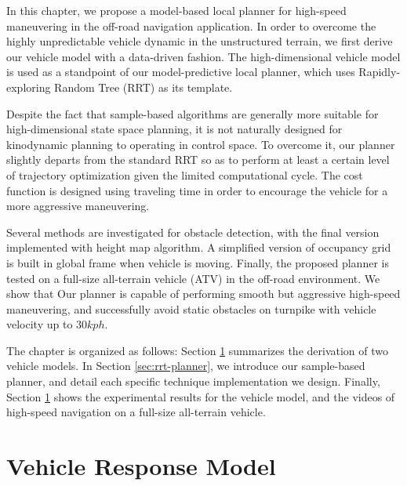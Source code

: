 \documentclass[../thesis.tex]{subfiles}
\begin{document}
In this chapter, we propose a model-based local planner for high-speed maneuvering in the off-road navigation application. In order to overcome the highly unpredictable vehicle dynamic in the unstructured terrain, we first derive our vehicle model with a data-driven fashion. The high-dimensional vehicle model is used as a standpoint of our model-predictive local planner, which uses Rapidly-exploring Random Tree (RRT) \cite{kuffner2000rrt} as its template. 

Despite the fact that sample-based algorithms are generally more suitable for high-dimensional state space planning, it is not naturally designed for kinodynamic planning to operating in control space. To overcome it, our planner slightly departs from the standard RRT so as to perform at least a certain level of trajectory optimization given the limited computational cycle. The cost function is designed using traveling time in order to encourage the vehicle for a more aggressive maneuvering. 

Several methods are investigated for obstacle detection, with the final version implemented with height map algorithm. A simplified version of occupancy grid is built in global frame when vehicle is moving. Finally, the proposed planner is tested on a full-size all-terrain vehicle (ATV) in the off-road environment. We show that 
Our planner is capable of performing smooth but aggressive high-speed maneuvering, and successfully avoid static obstacles on turnpike with vehicle velocity up to $30 kph$.

The chapter is organized as follows:
Section \ref{sec:vehicle_model} summarizes the derivation of two vehicle models. In Section \ref{sec:rrt-planner}, we introduce our sample-based planner, and detail each specific technique implementation we design. Finally, Section \ref{sec:vehicle_model} shows the experimental results for the vehicle model, and the videos of high-speed navigation on a full-size all-terrain vehicle.

\section{Vehicle Response Model} \label{sec:vehicle_model}
\end{document}
